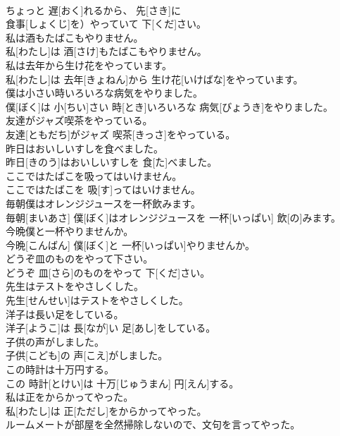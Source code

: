 \documentclass[8pt]{extreport}
\begin{document}
\begin{CJK}{UTF8}{min}
\\	ちょっと 遅[おく]れるから、 先[さき]に
\\	食事[しょくじ]を）やっていて 下[くだ]さい。
\\	私は酒もたばこもやりません。	
\\	私[わたし]は 酒[さけ]もたばこもやりません。
\\	私は去年から生け花をやっています。	
\\	私[わたし]は 去年[きょねん]から 生け花[いけばな]をやっています。
\\	僕は小さい時いろいろな病気をやりました。	
\\	僕[ぼく]は 小[ちい]さい 時[とき]いろいろな 病気[びょうき]をやりました。
\\	友達がジャズ喫茶をやっている。	
\\	友達[ともだち]がジャズ 喫茶[きっさ]をやっている。
\\	昨日はおいしいすしを食べました。	
\\	昨日[きのう]はおいしいすしを 食[た]べました。
\\	ここではたばこを吸ってはいけません。	
\\	ここではたばこを 吸[す]ってはいけません。
\\	毎朝僕はオレンジジュースを一杯飲みます。	
\\	毎朝[まいあさ] 僕[ぼく]はオレンジジュースを 一杯[いっぱい] 飲[の]みます。
\\	今晩僕と一杯やりませんか。	
\\	今晩[こんばん] 僕[ぼく]と 一杯[いっぱい]やりませんか。
\\	どうぞ皿のものをやって下さい。	
\\	どうぞ 皿[さら]のものをやって 下[くだ]さい。
\\	先生はテストをやさしくした。	
\\	先生[せんせい]はテストをやさしくした。
\\	洋子は長い足をしている。	
\\	洋子[ようこ]は 長[なが]い 足[あし]をしている。
\\	子供の声がしました。	
\\	子供[こども]の 声[こえ]がしました。
\\	この時計は十万円する。	
\\	この 時計[とけい]は 十万[じゅうまん] 円[えん]する。
\\	私は正をからかってやった。	
\\	私[わたし]は 正[ただし]をからかってやった。
\\	ルームメートが部屋を全然掃除しないので、文句を言ってやった。	

\end{CJK}
\end{document}
